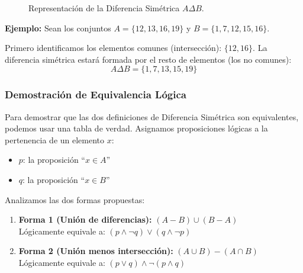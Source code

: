 \begin{figure}[ht]
\centering
{}
\caption{Representación de la Diferencia Simétrica $A \Delta B$.}\label{fig:simetrica}
\end{figure}

\noindent \textbf{Ejemplo:}
Sean los conjuntos $A=\{12,13,16,19\}$ y $B=\{1,7,12,15,16\}$.

Primero identificamos los elementos comunes (intersección): $\{12, 16\}$.
La diferencia simétrica estará formada por el resto de elementos (los no comunes):
\[ A \Delta B = \{1, 7, 13, 15, 19\} \]
\subsubsection*{Demostración de Equivalencia Lógica}

Para demostrar que las dos definiciones de Diferencia Simétrica son equivalentes, podemos usar una tabla de verdad. Asignamos proposiciones lógicas a la pertenencia de un elemento $x$:
\begin{itemize}
    \item $p$: la proposición ``$x \in A$''
    \item $q$: la proposición ``$x \in B$''
\end{itemize}

Analizamos las dos formas propuestas:
\begin{enumerate}
    \item \textbf{Forma 1 (Unión de diferencias):} $(A - B) \cup (B - A)$ \\
    Lógicamente equivale a: $(p \land \neg q) \lor (q \land \neg p)$
    \item \textbf{Forma 2 (Unión menos intersección):} $(A \cup B) - (A \cap B)$ \\
    Lógicamente equivale a: $(p \lor q) \land \neg(p \land q)$
\end{enumerate}

